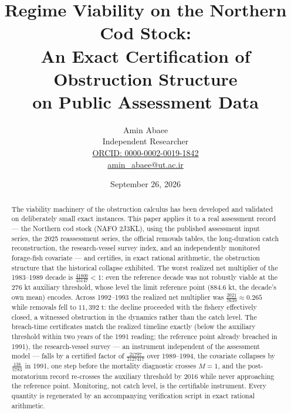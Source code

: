 \documentclass[10pt,twocolumn]{article}
\theoremstyle{plain}
\theoremstyle{remark}
\begin{document}
\title{Regime Viability on the Northern Cod Stock:\\
An Exact Certification of Obstruction Structure\\
on Public Assessment Data}
\author{Amin Abaee\\[0.35em]
{\small Independent Researcher}\\[0.55em]
{\small\href{https://orcid.org/0000-0002-0019-1842}{ORCID: 0000-0002-0019-1842}}\\[0.3em]
{\small\href{mailto:amin\_abaee@ut.ac.ir}{amin\_abaee@ut.ac.ir}}}
\date{September 26, 2026}
\maketitle

\begin{abstract}
The viability machinery of the obstruction calculus has been developed
and validated on deliberately small exact instances. This paper applies
it to a real assessment record --- the Northern cod stock (NAFO 2J3KL),
using the published assessment input series, the 2025 reassessment
series, the official removals tables, the long-duration catch
reconstruction, the research-vessel survey index, and an independently
monitored forage-fish covariate --- and certifies, in exact rational
arithmetic, the obstruction structure that the historical collapse
exhibited. The worst realized net multiplier of the 1983--1989 decade
is \(\tfrac{41800}{45147} < 1\): even the reference decade was not
robustly viable at the \(276\) kt auxiliary threshold, whose level the
limit reference point (\(884.6\) kt, the decade's own mean) encodes.
Across 1992--1993 the realized net multiplier was
\(\tfrac{2021}{7639} \approx 0.265\) while removals fell to
\(11{,}392\) t: the decline proceeded with the fishery effectively
closed, a witnessed obstruction in the dynamics rather than the catch
level. The breach-time certificates match the realized timeline exactly
(below the auxiliary threshold within two years of the 1991 reading;
the reference point already breached in 1991), the research-vessel
survey --- an instrument independent of the assessment model --- falls
by a certified factor of \(\tfrac{21797}{2127417}\) over 1989--1994,
the covariate collapses by \(\tfrac{138}{5783}\) in 1991, one step
before the mortality diagnostic crosses \(M = 1\), and the
post-moratorium record re-crosses the auxiliary threshold by 2016 while
never approaching the reference point. Monitoring, not catch level, is
the certifiable instrument. Every quantity is regenerated by an
accompanying verification script in exact rational arithmetic.
\end{abstract}
\end{document}

